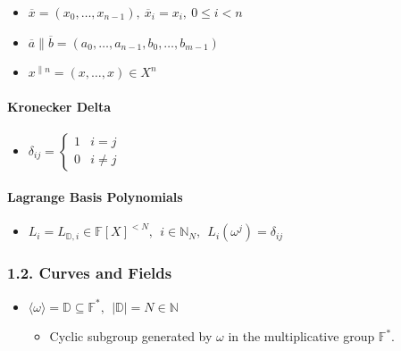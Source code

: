 \documentclass[
]{article}
\providecommand{\tightlist}{%
  \setlength{\itemsep}{0pt}\setlength{\parskip}{0pt}}
\begin{document}
\begin{itemize}
\tightlist
\item
  \(\overline{x} = (x_0, \dots, x_{n-1}),\ \overline{x}_i = x_i,\ 0 \leq i < n\)
\item
  \(\overline{a} \| \overline{b} = (a_0, \ldots, a_{n-1}, b_0, \ldots, b_{m-1})\)
\item
  \(x^{\|n} = (x, \ldots, x) \in X^n\)
\end{itemize}

\paragraph{Kronecker Delta}\label{kronecker-delta}

\begin{itemize}
\tightlist
\item
  \(\delta_{ij} = \begin{cases}
  1 & i = j \\
  0 & i \neq j
  \end{cases}\)
\end{itemize}

\paragraph{Lagrange Basis Polynomials}\label{lagrange-basis-polynomials}

\begin{itemize}
\tightlist
\item
  \(L_i = L_{\mathbb{D}, i} \in \mathbb{F}[X]^{<N},\ \ i \in \mathbb{N}_N,\ \ L_i(\omega^j) = \delta_{ij}\)
\end{itemize}

\subsubsection{1.2. Curves and Fields}\label{curves-and-fields}

\begin{itemize}
\tightlist
\item
  \(\langle \omega \rangle = \mathbb{D} \subseteq \mathbb{F}^*,\ \ |\mathbb{D}| = N \in \mathbb{N}\)

  \begin{itemize}
  \tightlist
  \item
    Cyclic subgroup generated by \(\omega\) in the multiplicative group
    \(\mathbb{F}^*\).
  \end{itemize}
\end{itemize}
\end{document}
